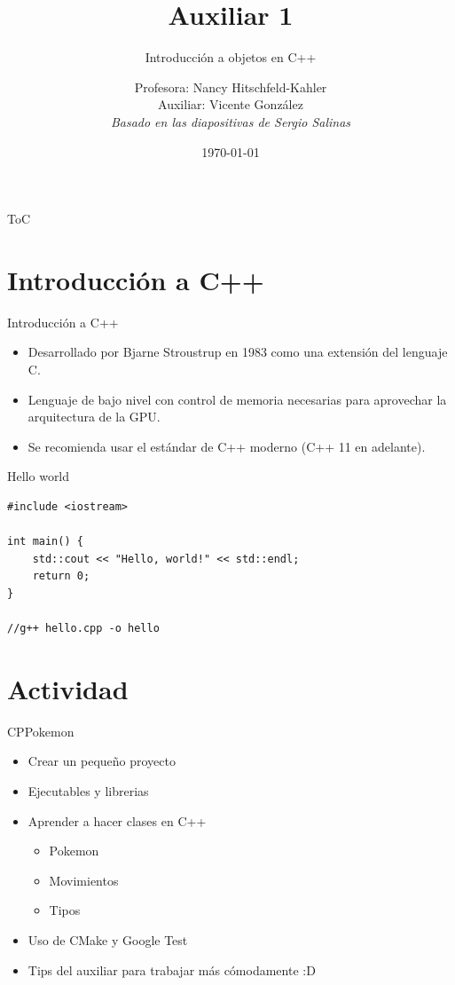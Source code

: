 \documentclass{beamer}
\title[Auxiliar 1]{Auxiliar 1}
\subtitle{Introducción a objetos en C++}
\author[Computación GPU]{Profesora: Nancy Hitschfeld-Kahler \\ Auxiliar: Vicente González \\ \textit{\scriptsize Basado en las diapositivas de Sergio Salinas }}
\institute[DCC - UChile]{CC7515-1 -- Computación en GPU}
\date{\today}
\begin{document}
\begin{frame}
  \titlepage
\end{frame}

\begin{frame}{ToC}
    \tableofcontents
\end{frame}

\section{Introducción a C++}

\begin{frame}{Introducción a C++}
    \begin{itemize}
        \item Desarrollado por Bjarne Stroustrup en 1983 como una extensión del lenguaje C.
        \item Lenguaje de bajo nivel con control de memoria necesarias para aprovechar la arquitectura de la GPU.
        \item Se recomienda usar el estándar de C++ moderno (C++ 11 en adelante).
    \end{itemize}
\end{frame}

\begin{frame}[fragile]{Hello world}

\begin{verbatim}
#include <iostream>

int main() {
    std::cout << "Hello, world!" << std::endl;
    return 0;
}

//g++ hello.cpp -o hello
\end{verbatim}

\end{frame}

\section{Actividad}

\begin{frame}{CPPokemon}

   \begin{itemize}
    \item Crear un pequeño proyecto
    \item Ejecutables y librerias 
    \item Aprender a hacer clases en C++
    \begin{itemize}
        \item Pokemon
        \item Movimientos
        \item Tipos
    \end{itemize}
    \item Uso de CMake y Google Test
    \item Tips del auxiliar para trabajar más cómodamente :D
   \end{itemize}
\end{frame}
\end{document}
